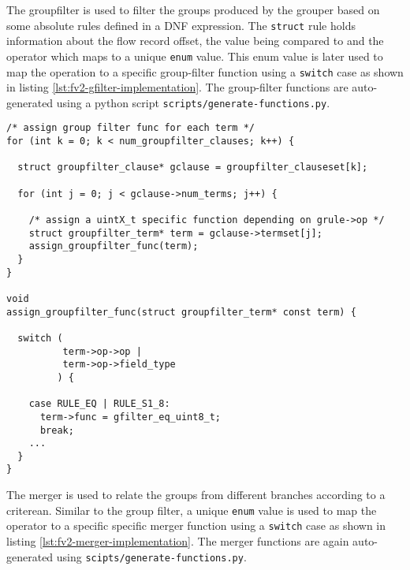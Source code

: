 The groupfilter is used to filter the groups produced by the grouper based on
some absolute rules defined in a \ac{DNF} expression. The \texttt{struct} rule
holds information about the flow record offset, the value being compared to
and the operator which maps to a unique \texttt{enum} value.  This enum
 value is later used to map the
operation to a specific group-filter function using a \texttt{switch} case as
shown in listing \ref{lst:fv2-gfilter-implementation}.  The group-filter
functions are auto-generated using a python script
\texttt{scripts/generate-functions.py}.

\begin{lstlisting}
/* assign group filter func for each term */
for (int k = 0; k < num_groupfilter_clauses; k++) {

  struct groupfilter_clause* gclause = groupfilter_clauseset[k];

  for (int j = 0; j < gclause->num_terms; j++) {

    /* assign a uintX_t specific function depending on grule->op */
    struct groupfilter_term* term = gclause->termset[j];
    assign_groupfilter_func(term);
  }
}

void
assign_groupfilter_func(struct groupfilter_term* const term) {

  switch (
          term->op->op |
          term->op->field_type
         ) {

    case RULE_EQ | RULE_S1_8:
      term->func = gfilter_eq_uint8_t;
      break;
    ...
  }
}
\end{lstlisting}

The merger is used to relate the groups from different branches according to a
criterean. Similar  to the group filter, a
unique \texttt{enum} value is used to map the operator to a specific specific
merger function using a \texttt{switch} case as shown in listing
\ref{lst:fv2-merger-implementation}.  The merger functions are again
auto-generated using \texttt{scipts/generate-functions.py}.

